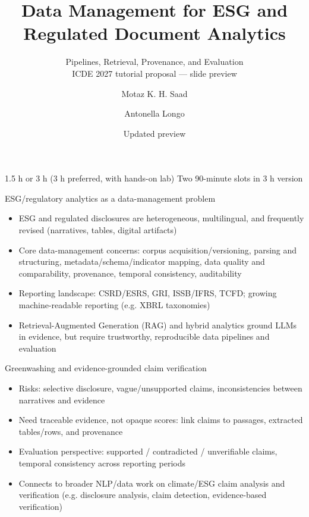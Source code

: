 \documentclass[aspectratio=169]{beamer}
\title{Data Management for ESG and Regulated Document Analytics}
\subtitle{Pipelines, Retrieval, Provenance, and Evaluation\\ICDE 2027 tutorial proposal --- slide preview}
\author{Motaz K. H. Saad \and Antonella Longo}
\institute{DataLab, Dept.\ of Engineering for Innovation, University of Salento}
\date{Updated preview}
\begin{document}
\begin{frame}
  \titlepage
  \vspace{0.3em}
  \small 1.5 h or 3 h (3 h preferred, with hands-on lab) \quad \textbullet \quad Two 90-minute slots in 3 h version
\end{frame}

\begin{frame}{ESG/regulatory analytics as a data-management problem}
  \begin{itemize}
    \item ESG and regulated disclosures are heterogeneous, multilingual, and frequently revised (narratives, tables, digital artifacts)
    \item Core data-management concerns: corpus acquisition/versioning, parsing and structuring, metadata/schema/indicator mapping, data quality and comparability, provenance, temporal consistency, auditability
    \item Reporting landscape: CSRD/ESRS, GRI, ISSB/IFRS, TCFD; growing machine-readable reporting (e.g. XBRL taxonomies)
    \item Retrieval-Augmented Generation (RAG) and hybrid analytics ground LLMs in evidence, but require trustworthy, reproducible data pipelines and evaluation
  \end{itemize}
\end{frame}

\begin{frame}{Greenwashing and evidence-grounded claim verification}
  \begin{itemize}
    \item Risks: selective disclosure, vague/unsupported claims, inconsistencies between narratives and evidence
    \item Need traceable evidence, not opaque scores: link claims to passages, extracted tables/rows, and provenance
    \item Evaluation perspective: supported / contradicted / unverifiable claims, temporal consistency across reporting periods
    \item Connects to broader NLP/data work on climate/ESG claim analysis and verification (e.g. disclosure analysis, claim detection, evidence-based verification)
  \end{itemize}
\end{frame}
\end{document}
